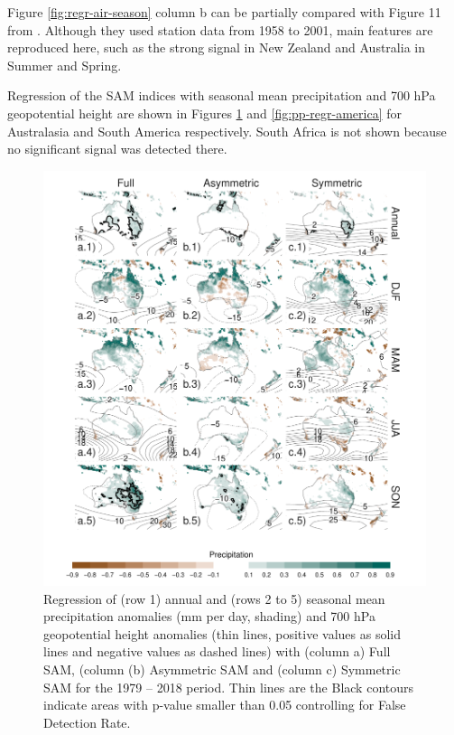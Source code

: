 \documentclass[smallextended]{svjour3}       %
\begin{document}
Figure \ref{fig:regr-air-season} column b can be partially compared with Figure 11 from \citet{fogt2012}. Although they used station data from 1958 to 2001, main features are reproduced here, such as the strong signal in New Zealand and Australia in Summer and Spring.

Regression of the SAM indices with seasonal mean precipitation and 700 hPa geopotential height are shown in Figures \ref{fig:pp-regr-oceania} and \ref{fig:pp-regr-america} for Australasia and South America respectively. South Africa is not shown because no significant signal was detected there.

\begin{figure}
\includegraphics{pp-regr-oceania-1} \caption{Regression of (row 1) annual and (rows 2 to 5) seasonal mean precipitation anomalies (mm per day, shading) and 700 hPa geopotential height anomalies (thin lines, positive values as solid lines and negative values as dashed lines) with (column a) Full SAM, (column (b) Asymmetric SAM and (column c) Symmetric SAM for the 1979 -- 2018 period. Thin lines are the Black contours indicate areas with p-value smaller than 0.05 controlling for False Detection Rate.}\label{fig:pp-regr-oceania}
\end{figure}
\end{document}
